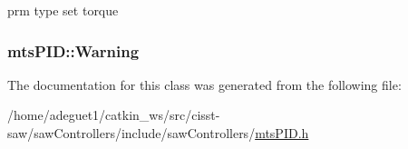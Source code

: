 prm type set torque 

\hypertarget{classmts_p_i_d_a8709a00ef29de0762de33660c1cd3167}{
\subsubsection[{Warning}]{ mts\-P\-I\-D\-::\-Warning}}\label{classmts_p_i_d_a8709a00ef29de0762de33660c1cd3167}


The documentation for this class was generated from the following file\-:\begin{DoxyCompactItemize}
\item 
/home/adeguet1/catkin\-\_\-ws/src/cisst-\/saw/saw\-Controllers/include/saw\-Controllers/\hyperlink{mts_p_i_d_8h}{mts\-P\-I\-D.\-h}\end{DoxyCompactItemize}
